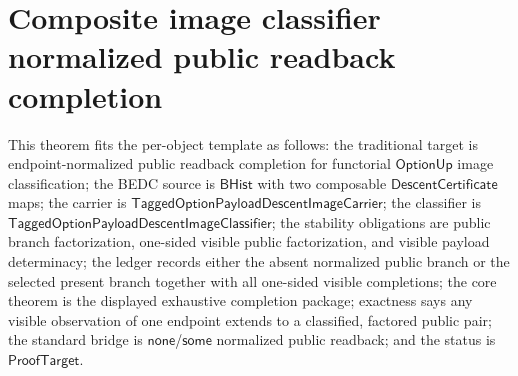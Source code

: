 \section{Composite image classifier normalized public readback completion}
\label{sec:option-composite-image-classifier-normalized-public-completion}

\begin{theorem}
\label{thm:tagged-option-composite-image-classifier-normalized-public-readback-completion-package}
This theorem fits the per-object template as follows: the traditional target is
endpoint-normalized public readback completion for functorial $\mathsf{OptionUp}$
image classification; the BEDC source is $\mathsf{BHist}$ with two composable
$\mathsf{DescentCertificate}$ maps; the carrier is
$\mathsf{TaggedOptionPayloadDescentImageCarrier}$; the classifier is
$\mathsf{TaggedOptionPayloadDescentImageClassifier}$; the stability obligations
are public branch factorization, one-sided visible public factorization, and
visible payload determinacy; the ledger records either the absent normalized
public branch or the selected present branch together with all one-sided
visible completions; the core theorem is the displayed exhaustive completion
package; exactness says any visible observation of one endpoint extends to a
classified, factored public pair; the standard bridge is
$\mathsf{none}$/$\mathsf{some}$ normalized public readback; and the status is
$\mathsf{ProofTarget}$.


\end{theorem}
